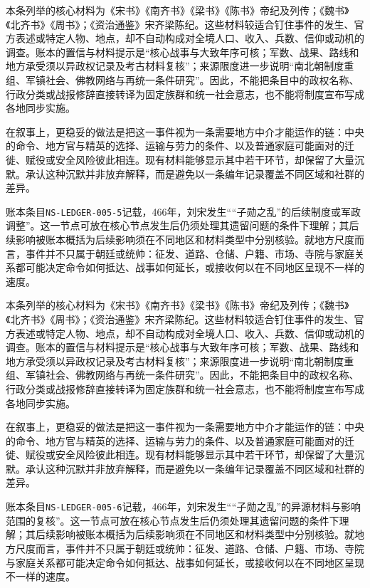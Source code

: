 本条列举的核心材料为《宋书》《南齐书》《梁书》《陈书》帝纪及列传；《魏书》《北齐书》《周书》；《资治通鉴》宋齐梁陈纪。这些材料较适合钉住事件的发生、官方表述或特定人物、地点，却不自动构成对全境人口、收入、兵数、信仰或动机的调查。账本的置信与材料提示是“核心战事与大致年序可核；军数、战果、路线和地方承受须以异政权记录及考古材料复核”；来源限度进一步说明“南北朝制度重组、军镇社会、佛教网络与再统一条件研究”。因此，不能把条目中的政权名称、行政分类或战报修辞直接转译为固定族群和统一社会意志，也不能将制度宣布写成各地同步实施。

在叙事上，更稳妥的做法是把这一事件视为一条需要地方中介才能运作的链：中央的命令、地方官与精英的选择、运输与劳力的条件、以及普通家庭可能面对的迁徙、赋役或安全风险彼此相连。现有材料能够显示其中若干环节，却保留了大量沉默。承认这种沉默并非放弃解释，而是避免以一条编年记录覆盖不同区域和社群的差异。

账本条目\texttt{NS-LEDGER-005-5}记载，466年，刘宋发生““子勋之乱”的后续制度或军政调整”。这一节点可放在核心节点发生后仍须处理其遗留问题的条件下理解；其后续影响被账本概括为后续影响须在不同地区和材料类型中分别核验。就地方尺度而言，事件并不只属于朝廷或统帅：征发、道路、仓储、户籍、市场、寺院与家庭关系都可能决定命令如何抵达、战事如何延长，或接收何以在不同地区呈现不一样的速度。

本条列举的核心材料为《宋书》《南齐书》《梁书》《陈书》帝纪及列传；《魏书》《北齐书》《周书》；《资治通鉴》宋齐梁陈纪。这些材料较适合钉住事件的发生、官方表述或特定人物、地点，却不自动构成对全境人口、收入、兵数、信仰或动机的调查。账本的置信与材料提示是“核心战事与大致年序可核；军数、战果、路线和地方承受须以异政权记录及考古材料复核”；来源限度进一步说明“南北朝制度重组、军镇社会、佛教网络与再统一条件研究”。因此，不能把条目中的政权名称、行政分类或战报修辞直接转译为固定族群和统一社会意志，也不能将制度宣布写成各地同步实施。

在叙事上，更稳妥的做法是把这一事件视为一条需要地方中介才能运作的链：中央的命令、地方官与精英的选择、运输与劳力的条件、以及普通家庭可能面对的迁徙、赋役或安全风险彼此相连。现有材料能够显示其中若干环节，却保留了大量沉默。承认这种沉默并非放弃解释，而是避免以一条编年记录覆盖不同区域和社群的差异。

账本条目\texttt{NS-LEDGER-005-6}记载，466年，刘宋发生““子勋之乱”的异源材料与影响范围的复核”。这一节点可放在核心节点发生后仍须处理其遗留问题的条件下理解；其后续影响被账本概括为后续影响须在不同地区和材料类型中分别核验。就地方尺度而言，事件并不只属于朝廷或统帅：征发、道路、仓储、户籍、市场、寺院与家庭关系都可能决定命令如何抵达、战事如何延长，或接收何以在不同地区呈现不一样的速度。

